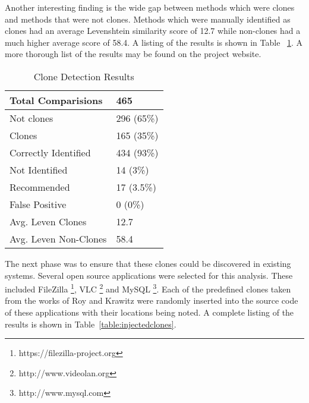 \documentclass[conference]{IEEEtran}
\begin{document}
Another interesting finding is the wide gap between methods which were clones and methods that were not clones. Methods which were manually identified as clones had an average Levenshtein similarity score of  12.7 while non-clones had a much higher average score of 58.4. A listing of the results is shown in Table ~\ref{table:completeKrawresults}. A more thorough list of the results may be found on the project website. 





\begin{table}[thb!]
\begin{center}
    \begin{tabular}{ l | l }
    \toprule
 	Total Comparisions & 465 \\ \hline
	Not clones & 296 (65\%) \\ \hline
	Clones & 165  (35\%)  \\ \hline
	Correctly Identified & 434 (93\%) \\ \hline
	Not Identified & 14  (3\%) \\ \hline
	Recommended & 17  (3.5\%) \\ \hline
	False Positive & 0  (0\%) \\ \hline
	Avg. Leven Clones & 12.7 \\ \hline
	Avg. Leven Non-Clones & 58.4 \\ \bottomrule

    \end{tabular}
    \caption{Clone Detection Results}
    \vspace{-0.2in}
\end{center}


\label{table:completeKrawresults}
\end{table}



The next phase was to ensure that these clones could be discovered in existing systems. Several open source applications were selected for this analysis. These included FileZilla \footnote{https://filezilla-project.org}, VLC \footnote{http://www.videolan.org} and MySQL \footnote{http://www.mysql.com}. Each of the predefined clones taken from the works of Roy and Krawitz were randomly inserted into the source code of these applications with their locations being noted. A complete listing of the results is shown in Table~\ref{table:injectedclones}.
\end{document}
